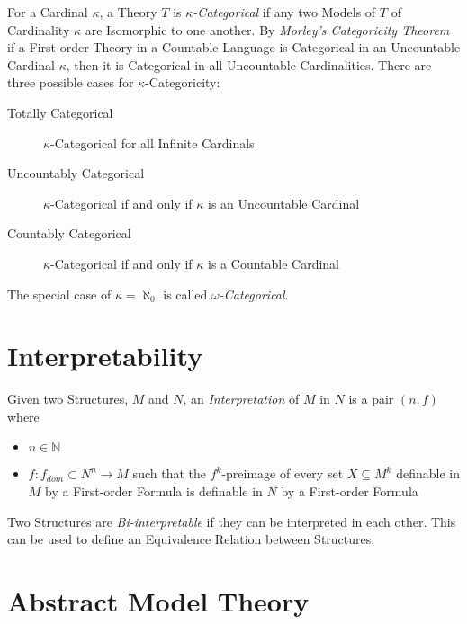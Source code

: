 For a Cardinal $\kappa$, a Theory $T$ is \emph{$\kappa$-Categorical}
if any two Models of $T$ of Cardinality $\kappa$ are Isomorphic to one
another. By \emph{Morley's Categoricity Theorem}\cite{morley65} if a
First-order Theory in a Countable Language is Categorical in an
Uncountable Cardinal $\kappa$, then it is Categorical in all
Uncountable Cardinalities. There are three possible cases for
$\kappa$-Categoricity:
\begin{description}
\item[Totally Categorical] $\kappa$-Categorical for all Infinite
  Cardinals
\item[Uncountably Categorical] $\kappa$-Categorical if and only if
  $\kappa$ is an Uncountable Cardinal
\item[Countably Categorical] $\kappa$-Categorical if and only if
  $\kappa$ is a Countable Cardinal
\end{description}
The special case of $\kappa = \aleph_0$ is called
\emph{$\omega$-Categorical}.



\section{Interpretability}

Given two Structures, $M$ and $N$, an \emph{Interpretation} of $M$ in
$N$ is a pair $(n,f)$ where
\begin{itemize}
    \item $n \in \mathbb{N}$
    \item $f:f_{dom} \subset N^n \rightarrow M$ such that the
      $f^k$-preimage of every set $X \subseteq M^k$ definable in $M$
      by a First-order Formula is definable in $N$ by a First-order
      Formula
\end{itemize}

Two Structures are \emph{Bi-interpretable} if they can be interpreted
in each other. This can be used to define an Equivalence Relation
between Structures.



\section{Abstract Model Theory}

